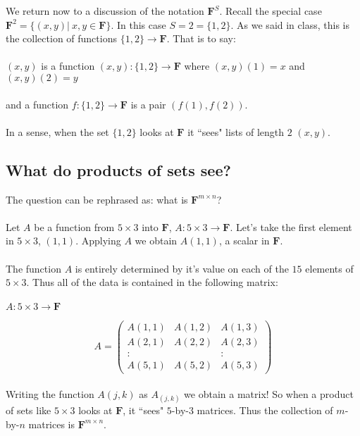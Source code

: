 \documentclass{article}
\theoremstyle{problemstyle}
\begin{document}
We return now to a discussion of the notation $\textbf{F}^S$.  Recall the special case $\textbf{F}^2 = \{(x,y) | \ x,y \in \textbf{F} \}$. In this case $S = 2 = \{1,2\}$. As we said in class, this is the collection of functions $\{1,2\} \rightarrow \textbf{F}$. That is to say: \\\\ $(x,y)$ is a function $(x,y): \{1,2\} \rightarrow \textbf{F}$ where $(x,y)(1)= x$ and $(x,y)(2) = y$ \\\\ and a function $f:\{1,2\} \rightarrow \textbf{F}$ is a pair $(f(1),f(2))$. \\\\ In a sense, when the set $\{1,2\}$ looks at $\textbf{F}$ it ``sees" lists of length $2$ $(x,y)$. 

\subsection*{What do products of sets see?}

The question can be rephrased as: what is $\textbf{F}^{m\times n}$?\\\\ Let $A$ be a function from $5 \times 3$ into $\textbf{F}$, $A:5\times 3 \rightarrow \textbf{F}$. Let's take the first element in $5\times 3$, $(1,1)$.  Applying $A$ we obtain $A(1,1)$, a scalar in $\textbf{F}$.\\\\ The function $A$ is entirely determined by it's value on each of the $15$ elements of $5 \times 3$. Thus all of the data is contained in the following matrix:\\\\ $A:5\times 3 \rightarrow \textbf{F}$

\begin{equation}
A =
\begin{pmatrix} A(1,1) & A(1,2) & A(1,3) \\ A(2,1) & A(2,2) & A(2,3) \\ : &  & : \\ A(5,1) & A(5,2) & A(5,3) \end{pmatrix}
\end{equation}\\


Writing the function $A(j,k)$ as $A_{(j,k)}$ we obtain a matrix! So when a product of sets like $5\times 3$ looks at $\textbf{F}$, it ``sees" $5$-by-$3$ matrices. Thus the collection of $m$-by-$n$ matrices is $\textbf{F}^{m\times n}$. 
\end{document}
